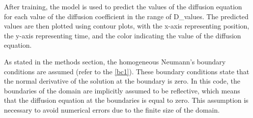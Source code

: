 After training, the model is used to predict the values of the diffusion equation for each value of the diffusion coefficient in the range of D\_values. The predicted values are then plotted using contour plots, with the x-axis representing position, the y-axis representing time, and the color indicating the value of the diffusion equation.

As stated in the methods section, the homogeneous Neumann's boundary conditions are assumed (refer to the \eqref{bc1}). These boundary conditions state that the normal derivative of the solution at the boundary is zero. In this code, the boundaries of the domain are implicitly assumed to be reflective, which means that the diffusion equation at the boundaries is equal to zero. This assumption is necessary to avoid numerical errors due to the finite size of the domain.
 
